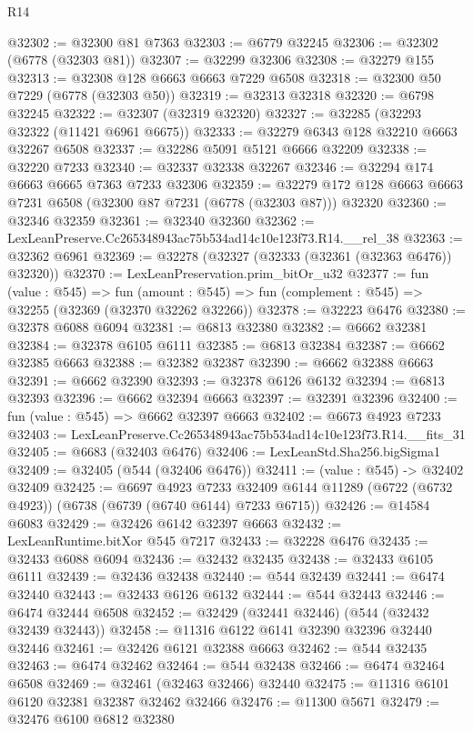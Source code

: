 \begin{lexlean}{R14}
\begin{coremodule}
@32302 := @32300 @81 @7363
@32303 := @6779 @32245
@32306 := @32302 (@6778 (@32303 @81))
@32307 := @32299 @32306
@32308 := @32279 @155
@32313 := @32308 @128 @6663 @6663 @7229 @6508
@32318 := @32300 @50 @7229 (@6778 (@32303 @50))
@32319 := @32313 @32318
@32320 := @6798 @32245
@32322 := @32307 (@32319 @32320)
@32327 := @32285 (@32293 @32322 (@11421 @6961 @6675))
@32333 := @32279 @6343 @128 @32210 @6663 @32267 @6508
@32337 := @32286 @5091 @5121 @6666 @32209
@32338 := @32220 @7233
@32340 := @32337 @32338 @32267
@32346 := @32294 @174 @6663 @6665 @7363 @7233 @32306
@32359 := @32279 @172 @128 @6663 @6663 @7231 @6508 (@32300 @87 @7231 (@6778 (@32303 @87))) @32320
@32360 := @32346 @32359
@32361 := @32340 @32360
@32362 := LexLeanPreserve.Cc265348943ac75b534ad14c10e123f73.R14.__rel_38
@32363 := @32362 @6961
@32369 := @32278 (@32327 (@32333 (@32361 (@32363 @6476)) @32320))
@32370 := LexLeanPreservation.prim_bitOr_u32
@32377 := fun (value : @545) =>
  fun (amount : @545) => fun (complement : @545) => @32255 (@32369 (@32370 @32262 @32266))
@32378 := @32223 @6476
@32380 := @32378 @6088 @6094
@32381 := @6813 @32380
@32382 := @6662 @32381
@32384 := @32378 @6105 @6111
@32385 := @6813 @32384
@32387 := @6662 @32385 @6663
@32388 := @32382 @32387
@32390 := @6662 @32388 @6663
@32391 := @6662 @32390
@32393 := @32378 @6126 @6132
@32394 := @6813 @32393
@32396 := @6662 @32394 @6663
@32397 := @32391 @32396
@32400 := fun (value : @545) => @6662 @32397 @6663
@32402 := @6673 @4923 @7233
@32403 := LexLeanPreserve.Cc265348943ac75b534ad14c10e123f73.R14.__fits_31
@32405 := @6683 (@32403 @6476)
@32406 := LexLeanStd.Sha256.bigSigma1
@32409 := @32405 (@544 (@32406 @6476))
@32411 := (value : @545) -> @32402 @32409
@32425 := @6697
    @4923
    @7233
    @32409
    @6144
    @11289
    (@6722 (@6732 @4923))
    (@6738 (@6739 (@6740 @6144) @7233 @6715))
@32426 := @14584 @6083
@32429 := @32426 @6142 @32397 @6663
@32432 := LexLeanRuntime.bitXor @545 @7217
@32433 := @32228 @6476
@32435 := @32433 @6088 @6094
@32436 := @32432 @32435
@32438 := @32433 @6105 @6111
@32439 := @32436 @32438
@32440 := @544 @32439
@32441 := @6474 @32440
@32443 := @32433 @6126 @6132
@32444 := @544 @32443
@32446 := @6474 @32444 @6508
@32452 := @32429 (@32441 @32446) (@544 (@32432 @32439 @32443))
@32458 := @11316 @6122 @6141 @32390 @32396 @32440 @32446
@32461 := @32426 @6121 @32388 @6663
@32462 := @544 @32435
@32463 := @6474 @32462
@32464 := @544 @32438
@32466 := @6474 @32464 @6508
@32469 := @32461 (@32463 @32466) @32440
@32475 := @11316 @6101 @6120 @32381 @32387 @32462 @32466
@32476 := @11300 @5671
@32479 := @32476 @6100 @6812 @32380

\end{coremodule}
\end{lexlean}
